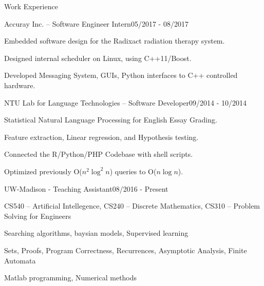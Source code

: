 \documentclass{resume} %
\begin{document}
\begin{rSection}{Work Experience}

    \begin{rSubsection}{Accuray Inc. -- Software Engineer Intern}{05/2017 - 08/2017}{}{}%
\item Embedded software design for the Radixact radiation therapy system.
\item Designed internal scheduler on Linux, using C++11/Boost.
\item Developed Messaging System, GUIs, Python interfaces to C++ controlled hardware. 
\end{rSubsection}

\begin{rSubsection}{NTU Lab for Language Technologies -- Software Developer}{09/2014 - 10/2014}{}{}%
\item Statistical Natural Language Processing for English Essay Grading.
\item Feature extraction, Linear regression, and Hypothesis testing.
\item Connected the R/Python/PHP Codebase with shell scripts.
\item Optimized previously O($n^2\log^2n$) queries to O($n\log n$).
\end{rSubsection}

\begin{rSubsection}{UW-Madison - Teaching Assistant}{08/2016 - Present}{}{}%
\item CS540 -- Artificial Intellegence, CS240 -- Discrete Mathematics, CS310 -- Problem Solving for Engineers
\item Searching algorithms, baysian models, Supervised learning
\item Sets, Proofs, Program Correctness, Recurrences, Asymptotic Analysis, Finite Automata
\item Matlab programming, Numerical methods
\end{rSubsection}


\end{rSection}
\end{document}
